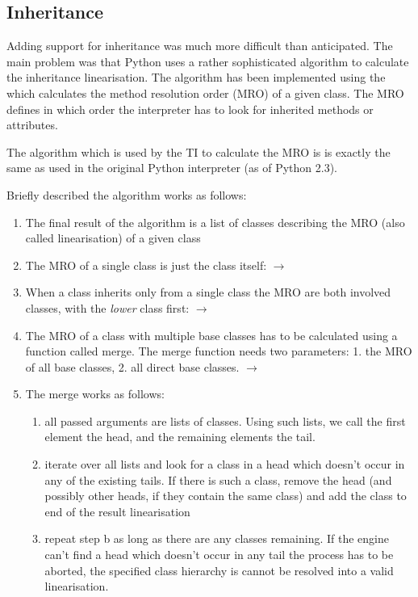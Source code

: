 \documentclass[12pt,halfparskip,DIV11,BCOR10mm]{scrreprt}
\begin{document}
\subsection{Inheritance}
\label{ti_inheritance}

Adding support for inheritance was much more difficult than anticipated. The main problem was that Python uses a rather sophisticated algorithm to calculate the inheritance linearisation. The algorithm has been implemented using the  which calculates the method resolution
order (MRO) of a given class. The MRO defines in which order the interpreter has to look for inherited methods or attributes. 

The algorithm which is used by the TI to calculate the MRO is is exactly the same as used in the original 
Python interpreter (as of Python 2.3).

Briefly described the algorithm works as follows: 
\begin{enumerate}
    \item The final result of the algorithm is a list of classes describing the MRO (also called linearisation) of a given class 
    \item The MRO of a single class is just the class itself:  $\rightarrow$ 
    \item When a class inherits only from a single class the MRO are both involved classes,  with the \emph{lower} class first:  $\rightarrow$ 
    \item The MRO of a class with multiple base classes has to be calculated using a function called merge. The merge function needs two parameters: 1. the MRO of all base classes, 2. all direct base classes.   $\rightarrow$ 
    \item The merge works as follows:
 \begin{enumerate}
    \item all passed arguments are lists of classes. Using such lists, we call the first element the head, and the remaining elements the tail. 
    \item iterate over all lists and look for a class in a head which doesn't occur in any of the existing tails. If there is such a class, remove the head (and possibly other heads, if they contain the same class) and add the class to end of the result linearisation
    \item repeat step b as long as there are any classes remaining. If the engine can't find a head which doesn't occur in any tail the process has to be aborted, the specified class hierarchy is cannot be resolved into a valid linearisation. 
 \end{enumerate}
\end{enumerate}
\end{document}
